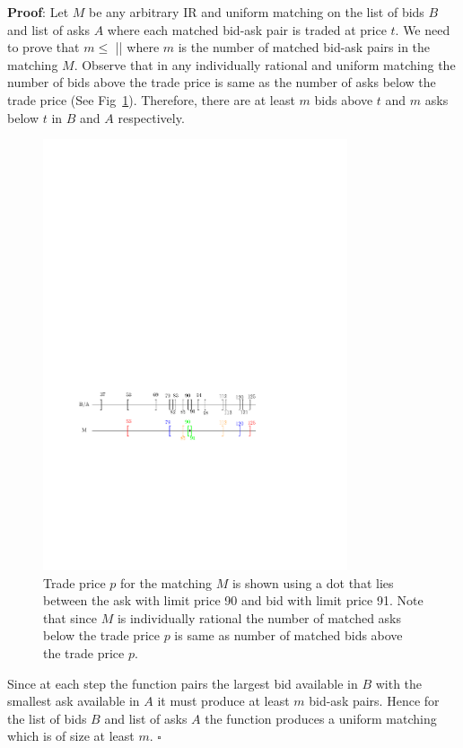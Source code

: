 \documentclass[a4paper,UKenglish,cleveref, autoref]{lipics-v2019}
\begin{document}
\textbf{Proof}: Let $M$ be any arbitrary IR and uniform matching on the list of bids $B$ and list of asks $A$ where each matched bid-ask pair is traded at price $t$. We need to prove that $m \leq$ || where $m$ is the number of matched bid-ask pairs in the matching $M$. Observe that in any individually rational and uniform matching the number of bids above  the trade price is same as the number of asks below the trade price (See Fig~\ref{fig:UM_match}). Therefore, there are at least $m$ bids above $t$ and $m$ asks below $t$ in $B$ and $A$ respectively. 

\begin{figure}[h!]
\centering
\includegraphics[width=0.8\textwidth]{UM_matching.pdf}
\caption{ Trade price $p$ for the matching $M$ is shown using a dot that lies between the ask with limit price 90 and bid with limit price 91. Note that since $M$ is individually rational the number of matched asks below the trade price $p$ is same as number of matched bids above the trade price $p$. }
\label{fig:UM_match}
\end{figure}

Since at each step the function   pairs the largest bid available in $B$ with the smallest ask available in $A$ it must produce  at least $m$ bid-ask pairs. Hence for the list of bids $B$ and list of asks $A$ the function  produces a uniform matching which is of size at least $m$. $\square$
\end{document}
